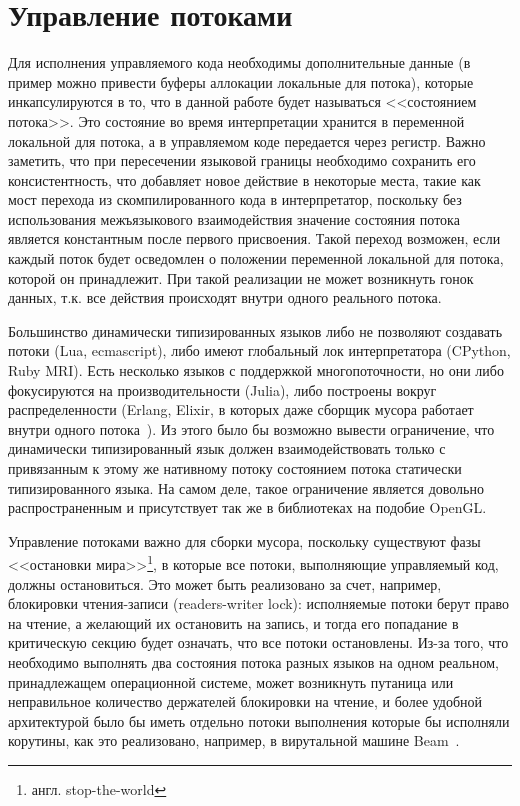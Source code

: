 \documentclass[times
,titlepage
]{itmo-student-thesis}
\begin{document}
\section{Управление потоками} \label{sec:thread-management}
Для исполнения управляемого кода необходимы дополнительные данные (в пример можно привести буферы аллокации локальные для потока), которые инкапсулируются в то, что в данной работе будет называться <<состоянием потока>>. Это состояние во время интерпретации хранится в переменной локальной для потока, а в управляемом коде передается через регистр. Важно заметить, что при пересечении языковой границы необходимо сохранить его консистентность, что добавляет новое действие в некоторые места, такие как мост перехода из скомпилированного кода в интерпретатор, поскольку без использования межъязыкового взаимодействия значение состояния потока является константным после первого присвоения. Такой переход возможен, если каждый поток будет осведомлен о положении переменной локальной для потока, которой он принадлежит. При такой реализации не может возникнуть гонок данных, т.к. все действия происходят внутри одного реального потока.

Большинство динамически типизированных языков либо не позволяют создавать потоки (Lua, ecmascript), либо имеют глобальный лок интерпретатора (CPython, Ruby MRI). Есть несколько языков с поддержкой многопоточности, но они либо фокусируются на производительности (Julia), либо построены вокруг распределенности (Erlang, Elixir, в которых даже сборщик мусора работает внутри одного потока~\cite{erlang-gc}). Из этого было бы возможно вывести ограничение, что динамически типизированный язык должен взаимодействовать только с привязанным к этому же нативному потоку состоянием потока статически типизированного языка. На самом деле, такое ограничение является довольно распространенным и присутствует так же в библиотеках на подобие OpenGL.

Управление потоками важно для сборки мусора, поскольку существуют фазы <<остановки мира>>\footnote{англ. stop-the-world}, в которые все потоки, выполняющие управляемый код, должны остановиться. Это может быть реализовано за счет, например, блокировки чтения-записи (readers-writer lock): исполняемые потоки берут право на чтение, а желающий их остановить на запись, и тогда его попадание в критическую секцию будет означать, что все потоки остановлены. Из-за того, что необходимо выполнять два состояния потока разных языков на одном реальном, принадлежащем операционной системе, может возникнуть путаница или неправильное количество держателей блокировки на чтение, и более удобной архитектурой было бы иметь отдельно потоки выполнения которые бы исполняли корутины, как это реализовано, например, в вирутальной машине Beam~\cite{beam-proc}.
\end{document}
